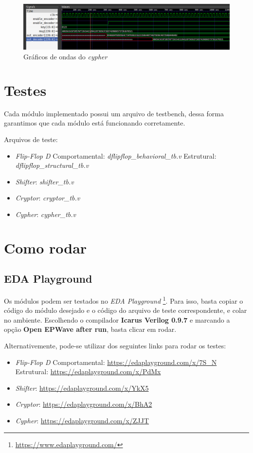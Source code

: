 \documentclass{article}
\begin{document}
\begin{figure}[H]
    \centering
    \includegraphics[width=\textwidth]{images/cypher_wave.png}
    \caption{Gráficos de ondas do \emph{cypher}}
    \label{fig:cypher_wave}
\end{figure}


\section{Testes}

Cada módulo implementado possui um arquivo de testbench, dessa forma garantimos que cada módulo está funcionando corretamente. 

Arquivos de teste:
\begin{itemize}
    \item \emph{Flip-Flop D}
        \subitem Comportamental: \emph{dflipflop\_behavioral\_tb.v} 
        \subitem Estrutural: \emph{dflipflop\_structural\_tb.v}
    \item \emph{Shifter}: \emph{shifter\_tb.v}
    \item \emph{Cryptor}: \emph{cryptor\_tb.v}
    \item \emph{Cypher}: \emph{cypher\_tb.v}
\end{itemize}

\section{Como rodar}
\subsection{EDA Playground}

Os módulos podem ser testados no \emph{EDA Playground} \footnote{\url{https://www.edaplayground.com/}}. Para isso, basta copiar o código do módulo desejado e o código do arquivo de teste correspondente, e colar no ambiente. Escolhendo o compilador \textbf{Icarus Verilog 0.9.7} e marcando a opção \textbf{Open EPWave after run}, basta clicar em rodar. 

Alternativemente, pode-se utilizar dos seguintes links para rodar os testes:
\begin{itemize}
    \item \emph{Flip-Flop D}
        \subitem Comportamental: \url{https://edaplayground.com/x/7S_N}
        \subitem Estrutural: \url{https://edaplayground.com/x/PdMx}
    \item \emph{Shifter}: \url{https://edaplayground.com/x/YkX5}
    \item \emph{Cryptor}: \url{https://edaplayground.com/x/BhA2}
    \item \emph{Cypher}: \url{https://edaplayground.com/x/ZJJT}

\end{itemize}
\end{document}
